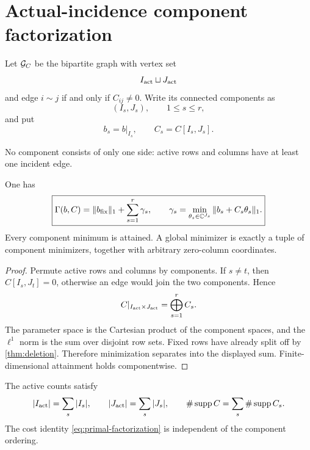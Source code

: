 \section{Actual-incidence component factorization}
\label{sec:components}

\begin{definition}
\label{def:actual-graph}
Let \(\mathcal G_C\) be the bipartite graph with vertex set
\[
 I_{\rm act}\sqcup J_{\rm act}
\]
and edge \(i\sim j\) if and only if \(C_{ij}\ne0\).
Write its connected components as
\[
 (I_s,J_s),\qquad 1\le s\le r,
\]
and put
\[
 b_s=b|_{I_s},
 \qquad
 C_s=C[I_s,J_s].
\]
\end{definition}

No component consists of only one side: active rows and columns have at
least one incident edge.

\begin{theorem}
\label{thm:primal-factorization}
One has
\begin{equation}
 \boxed{
 \Gamma(b,C)
 =
 \|b_{\rm fix}\|_1
 +
 \sum_{s=1}^r\gamma_s,
 \qquad
 \gamma_s
 =
 \min_{\theta_s\in\mathbb C^{J_s}}
 \|b_s+C_s\theta_s\|_1.}
 \label{eq:primal-factorization}
\end{equation}
Every component minimum is attained. A global minimizer is exactly a
tuple of component minimizers, together with arbitrary zero-column
coordinates.
\end{theorem}

\begin{proof}
Permute active rows and columns by components. If \(s\ne t\), then
\(C[I_s,J_t]=0\), otherwise an edge would join the two components.
Hence
\[
 C|_{I_{\rm act}\times J_{\rm act}}
 =
 \bigoplus_{s=1}^rC_s.
\]
The parameter space is the Cartesian product of the component spaces,
and the \(\ell^1\) norm is the sum over disjoint row sets. Fixed rows
have already split off by \cref{thm:deletion}. Therefore minimization
separates into the displayed sum. Finite-dimensional attainment holds
componentwise.
\end{proof}

\begin{corollary}
\label{cor:census-identities}
The active counts satisfy
\[
 |I_{\rm act}|=\sum_s|I_s|,
 \qquad
 |J_{\rm act}|=\sum_s|J_s|,
 \qquad
 \#\operatorname{supp} C=\sum_s\#\operatorname{supp} C_s.
\]
The cost identity \eqref{eq:primal-factorization} is independent of the
component ordering.
\end{corollary}

